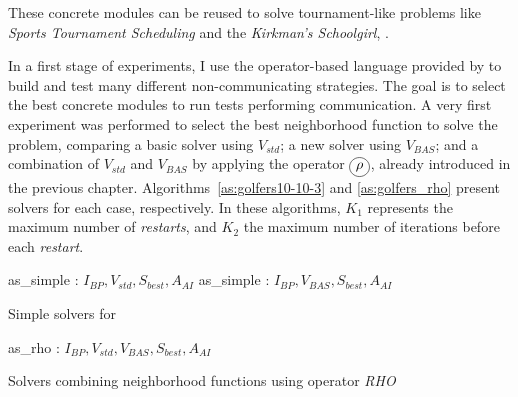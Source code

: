 These concrete modules can be  reused to solve tournament-like problems like \textit{Sports Tournament Scheduling} and the \textit{Kirkman's Schoolgirl}, .

In a first stage of experiments, I use the operator-based language provided by \posl{} to build and test many different non-communicating strategies. The goal is to select the best concrete modules to run tests performing communication. A very first experiment was performed to select the best neighborhood function to solve the problem, comparing a basic solver using $V_{std}$; a new solver using $V_{BAS}$; and a combination of $V_{std}$ and $V_{BAS}$ by applying the operator $\circled{$\rho$}$, already introduced in the previous chapter. Algorithms~\ref{as:golfers10-10-3} and \ref{as:golfers_rho} present solvers for each case, respectively. In these algorithms, $K_1$ represents the maximum number of {\it restarts}, and $K_2$ the maximum number of iterations before each \textit{restart}.

\begin{algorithm}[t]
\dontprintsemicolon
\SetNoline
{}
   as\_simple\;
\algoindent {} : $I_{BP}, V_{std}, S_{best}, A_{AI}$ \;
   as\_simple\;
\algoindent {} : $I_{BP}, V_{BAS}, S_{best}, A_{AI}$ \; 
\caption{Simple solvers for \SGP}\label{as:golfers10-10-3}
\end{algorithm}

\begin{algorithm}[H]
\dontprintsemicolon
\SetNoline
{}
   as\_rho\;
\algoindent {} : $I_{BP}, V_{std}, V_{BAS}, S_{best}, A_{AI}$ \;
\caption{Solvers combining neighborhood functions using operator {\it RHO}}\label{as:golfers_rho}
\end{algorithm}

